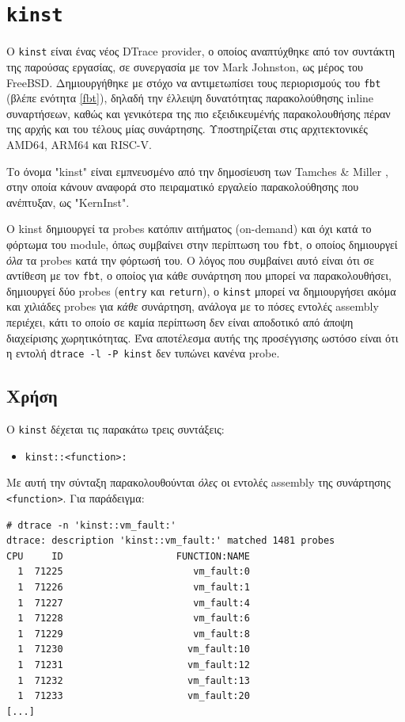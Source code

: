 \documentclass[12pt]{article}
\begin{document}
\section{\lstinline{kinst}} \label{kinst}

Ο \lstinline{kinst} είναι ένας νέος DTrace provider, ο οποίος αναπτύχθηκε από
τον συντάκτη της παρούσας εργασίας, σε συνεργασία με τον Mark Johnston, ως
μέρος του FreeBSD. Δημιουργήθηκε με στόχο να αντιμετωπίσει τους περιορισμούς
του \lstinline{fbt} (βλέπε ενότητα \ref{fbt}), δηλαδή την έλλειψη δυνατότητας
παρακολούθησης inline συναρτήσεων, καθώς και γενικότερα της πιο εξειδικευμένής
παρακολουθήσης πέραν της αρχής και του τέλους μίας συνάρτησης. Υποστηρίζεται
στις αρχιτεκτονικές AMD64, ARM64 και RISC-V.

Το όνομα "kinst" είναι εμπνευσμένο από την δημοσίευση των Tamches \& Miller
\cite{tamches}, στην οποία κάνουν αναφορά στο πειραματικό εργαλείο
παρακολούθησης που ανέπτυξαν, ως "KernInst".

Ο kinst δημιουργεί τα probes κατόπιν αιτήματος (on-demand) και όχι κατά το
φόρτωμα του module, όπως συμβαίνει στην περίπτωση του \lstinline{fbt}, ο οποίος
δημιουργεί \textit{όλα} τα probes κατά την φόρτωσή του. Ο λόγος που συμβαίνει
αυτό είναι ότι σε αντίθεση με τον \lstinline{fbt}, ο οποίος για κάθε συνάρτηση
που μπορεί να παρακολουθήσει, δημιουργεί δύο probes (\lstinline{entry} και
\lstinline{return}), ο \lstinline{kinst} μπορεί να δημιουργήσει ακόμα και
χιλιάδες probes για \textit{κάθε} συνάρτηση, ανάλογα με το πόσες εντολές
assembly περιέχει, κάτι το οποίο σε καμία περίπτωση δεν είναι αποδοτικό από
άποψη διαχείρισης χωρητικότητας. Ένα αποτέλεσμα αυτής της προσέγγισης ωστόσο
είναι ότι η εντολή \lstinline{dtrace -l -P kinst} δεν τυπώνει κανένα probe.

\subsection{Χρήση}

Ο \lstinline{kinst} δέχεται τις παρακάτω τρεις συντάξεις:

\begin{itemize}
	\item \lstinline{kinst::<function>:}
\end{itemize}

Με αυτή την σύνταξη παρακολουθούνται \textit{όλες} οι εντολές assembly της
συνάρτησης \lstinline{<function>}. Για παράδειγμα:

\begin{lstlisting}
# dtrace -n 'kinst::vm_fault:'
dtrace: description 'kinst::vm_fault:' matched 1481 probes
CPU     ID                    FUNCTION:NAME
  1  71225                       vm_fault:0
  1  71226                       vm_fault:1
  1  71227                       vm_fault:4
  1  71228                       vm_fault:6
  1  71229                       vm_fault:8
  1  71230                      vm_fault:10
  1  71231                      vm_fault:12
  1  71232                      vm_fault:13
  1  71233                      vm_fault:20
[...]
\end{lstlisting}
\end{document}
